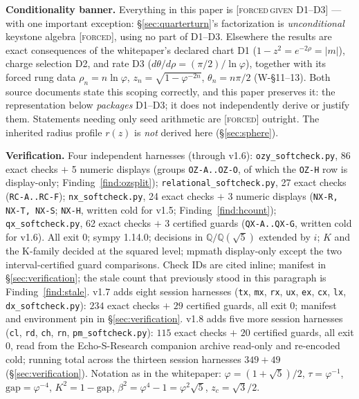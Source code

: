 \documentclass[11pt]{article}
\newcommand{\tagF}{\textcolor{cF}{\textsc{[forced]}}}
\newcommand{\tagFD}{\textcolor{cF}{\textsc{[forced}}\,\textcolor{cD}{\textsc{given D1--D3]}}}
\newcommand{\hx}[1]{\textcolor{cC}{\footnotesize\texttt{#1}}}
\newcommand{\Q}{\mathbb{Q}}
\newcommand{\gp}{\varphi}
\newcommand{\gapc}{\mathrm{gap}}
\theoremstyle{plain}
\theoremstyle{definition}
\theoremstyle{remark}
\begin{document}
\smallskip\noindent
\textbf{Conditionality banner.} Everything in this paper is
\tagFD{} --- with one important exception: \S\ref{sec:quarterturn}'s
factorization is \emph{unconditional} keystone algebra \tagF{}, using no part of
D1--D3. Elsewhere the results are exact consequences of the whitepaper's declared chart D1
($1-z^2=e^{-2\rho}=|m|$), charge selection D2, and rate D3
($d\theta/d\rho=(\pi/2)/\ln\gp$), together with its forced rung data
$\rho_n=n\ln\gp$, $z_n=\sqrt{1-\gp^{-2n}}$, $\theta_n=n\pi/2$ (W-\S11--13). Both
source documents state this scoping correctly, and this paper preserves it: the
representation below \emph{packages} D1--D3; it does not independently derive or
justify them. Statements needing only seed arithmetic are \tagF{} outright.
The inherited radius profile $r(z)$ is \emph{not} derived here (\S\ref{sec:sphere}).

\smallskip\noindent
\textbf{Verification.} Four independent harnesses (through v1.6):
\texttt{ozy\_softcheck.py}, 86 exact checks $+$ 5 numeric displays
(groups \hx{OZ-A..OZ-O}, of which the \hx{OZ-H} row is display-only;
Finding~\ref{find:ozsplit});
\texttt{relational\_softcheck.py}, 27 exact checks (\hx{RC-A..RC-F});
\texttt{nx\_softcheck.py}, 24 exact checks $+$ 3 numeric displays
(\hx{NX-R, NX-T, NX-S}; \hx{NX-H}, written cold for v1.5;
Finding~\ref{find:hcount}); \texttt{qx\_softcheck.py}, 62 exact checks
$+$ 3 certified guards (\hx{QX-A..QX-G}, written cold for v1.6). All
exit 0; sympy 1.14.0; decisions in $\Q/\Q(\sqrt5)$ extended by $i$; $K$
and the K-family decided at the squared level; mpmath display-only except
the two interval-certified guard comparisons. Check IDs are cited inline;
manifest in
\S\ref{sec:verification}; the stale count that previously stood in this
paragraph is Finding~\ref{find:stale}. v1.7 adds eight session harnesses
(\texttt{tx}, \texttt{mx}, \texttt{rx}, \texttt{ux}, \texttt{ex},
\texttt{cx}, \texttt{lx}, \texttt{dx}\texttt{\_softcheck.py}): $234$ exact
checks $+$ $29$ certified guards, all exit 0; manifest and environment pin
in \S\ref{sec:verification}. v1.8 adds five more session harnesses
(\texttt{cl}, \texttt{rd}, \texttt{ch}, \texttt{rn},
\texttt{pm}\texttt{\_softcheck.py}): $115$ exact checks $+$ $20$ certified
guards, all exit 0, read from the Echo-S-Research companion archive
read-only and re-encoded cold; running total across the thirteen session
harnesses $349+49$ (\S\ref{sec:verification}). Notation as in the whitepaper:
$\gp=(1+\sqrt5)/2$, $\tau=\gp^{-1}$, $\gapc=\gp^{-4}$, $K^2=1-\gapc$,
$\beta^2=\gp^4-1=\gp^2\sqrt5$, $z_c=\sqrt3/2$.
\end{document}
